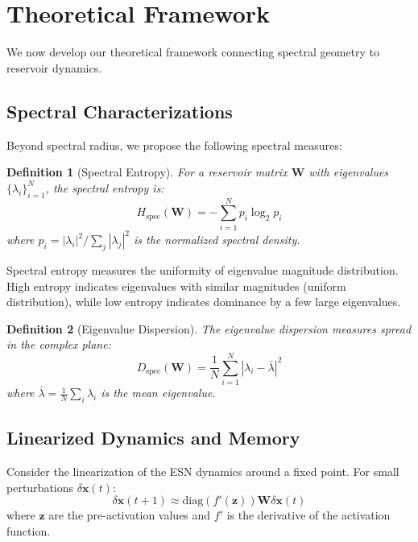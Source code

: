 \documentclass{article}
\newtheorem{definition}{Definition}
\begin{document}
\section{Theoretical Framework}
\label{sec:theory}

We now develop our theoretical framework connecting spectral geometry to reservoir dynamics.

\subsection{Spectral Characterizations}

Beyond spectral radius, we propose the following spectral measures:

\begin{definition}[Spectral Entropy]
For a reservoir matrix $\mathbf{W}$ with eigenvalues $\{\lambda_i\}_{i=1}^N$, the spectral entropy is:
\begin{equation}
H_{\text{spec}}(\mathbf{W}) = -\sum_{i=1}^N p_i \log_2 p_i
\end{equation}
where $p_i = |\lambda_i|^2 / \sum_j |\lambda_j|^2$ is the normalized spectral density.
\end{definition}

Spectral entropy measures the uniformity of eigenvalue magnitude distribution. High entropy indicates eigenvalues with similar magnitudes (uniform distribution), while low entropy indicates dominance by a few large eigenvalues.

\begin{definition}[Eigenvalue Dispersion]
The eigenvalue dispersion measures spread in the complex plane:
\begin{equation}
D_{\text{spec}}(\mathbf{W}) = \frac{1}{N} \sum_{i=1}^N |\lambda_i - \bar{\lambda}|^2
\end{equation}
where $\bar{\lambda} = \frac{1}{N}\sum_i \lambda_i$ is the mean eigenvalue.
\end{definition}

\subsection{Linearized Dynamics and Memory}

Consider the linearization of the ESN dynamics around a fixed point. For small perturbations $\delta \mathbf{x}(t)$:
\begin{equation}
\delta \mathbf{x}(t+1) \approx \text{diag}(f'(\mathbf{z})) \mathbf{W} \delta \mathbf{x}(t)
\end{equation}
where $\mathbf{z}$ are the pre-activation values and $f'$ is the derivative of the activation function.
\end{document}
